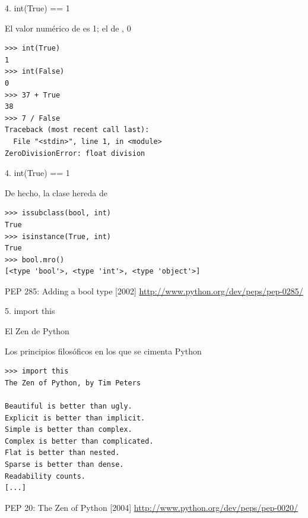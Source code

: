 \documentclass[14pt]{beamer}
\begin{document}
\begin{frame}[fragile]{4. int(True) == 1}
  \large
  \begin{alertblock}{}
    \centering
    El valor numérico de  es 1; el de , 0
  \end{alertblock}

  \begin{exampleblock}{}
    \small
    \begin{lstlisting}
>>> int(True)
1
>>> int(False)
0
>>> 37 + True
38
>>> 7 / False
Traceback (most recent call last):
  File "<stdin>", line 1, in <module>
ZeroDivisionError: float division
    \end{lstlisting}
  \end{exampleblock}
\end{frame}

\begin{frame}[fragile]{4. int(True) == 1}
  \large
  \begin{block}{}
    \centering
    De hecho, la clase  hereda de 
  \end{block}

  \begin{exampleblock}{}
    \small
    \begin{lstlisting}
>>> issubclass(bool, int)
True
>>> isinstance(True, int)
True
>>> bool.mro()
[<type 'bool'>, <type 'int'>, <type 'object'>]
    \end{lstlisting}
  \end{exampleblock}

  \small
  \begin{block}{\centering PEP 285: Adding a bool type [2002]}
    \centering \url{http://www.python.org/dev/peps/pep-0285/}
  \end{block}
\end{frame}

\begin{frame}[fragile]{5. import this}
  \Large
  \begin{block}{}
    \centering El Zen de Python
  \end{block}

  \begin{exampleblock}{\small Los principios filosóficos en los que se cimenta Python}
    \tiny
    \begin{lstlisting}
>>> import this
The Zen of Python, by Tim Peters

Beautiful is better than ugly.
Explicit is better than implicit.
Simple is better than complex.
Complex is better than complicated.
Flat is better than nested.
Sparse is better than dense.
Readability counts.
[...]
    \end{lstlisting}
  \end{exampleblock}

  \small
  \begin{block}{\centering PEP 20: The Zen of Python [2004]}
    \centering \url{http://www.python.org/dev/peps/pep-0020/}
  \end{block}
\end{frame}
\end{document}
